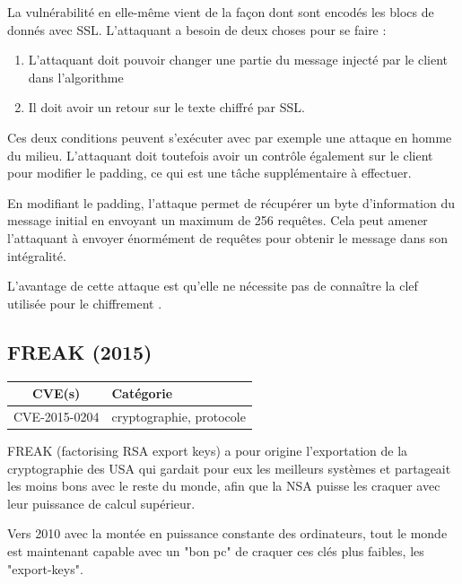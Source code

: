 La vulnérabilité en elle-même vient de la façon dont sont encodés les blocs de donnés avec SSL. L'attaquant a besoin de deux choses pour se faire :

\begin{enumerate}
    \item L'attaquant doit pouvoir changer une partie du message injecté par le client dans l'algorithme
    \item Il doit avoir un retour sur le texte chiffré par SSL.
\end{enumerate}

Ces deux conditions peuvent s'exécuter avec par exemple une attaque en homme du milieu. L'attaquant doit toutefois avoir un contrôle également sur le client pour modifier le padding, ce qui est une tâche supplémentaire à effectuer.

En modifiant le padding, l'attaque permet de récupérer un byte d'information du message initial en envoyant un maximum de 256 requêtes. Cela peut amener l'attaquant à envoyer énormément de requêtes pour obtenir le message dans son intégralité.

L'avantage de cette attaque est qu'elle ne nécessite pas de connaître la clef utilisée pour le chiffrement \cite{poodle}.




\subsection{FREAK (2015)}

\begin{tabularx}{0.96\textwidth}{|c|X|}
  \hline
  \textbf{CVE(s)} & \textbf{Catégorie} \\
  \hline
  CVE-2015-0204 & cryptographie, protocole \\
  \hline
\end{tabularx}

\vspace{1em}

FREAK (factorising RSA export keys) a pour origine l'exportation de la cryptographie des USA qui gardait pour eux les meilleurs systèmes et partageait les moins bons avec le reste du monde, afin que la NSA puisse les craquer avec leur puissance de calcul supérieur.

Vers 2010 avec la montée en puissance constante des ordinateurs, tout le monde est maintenant capable avec un "bon pc" de craquer ces clés plus faibles, les "export-keys".

